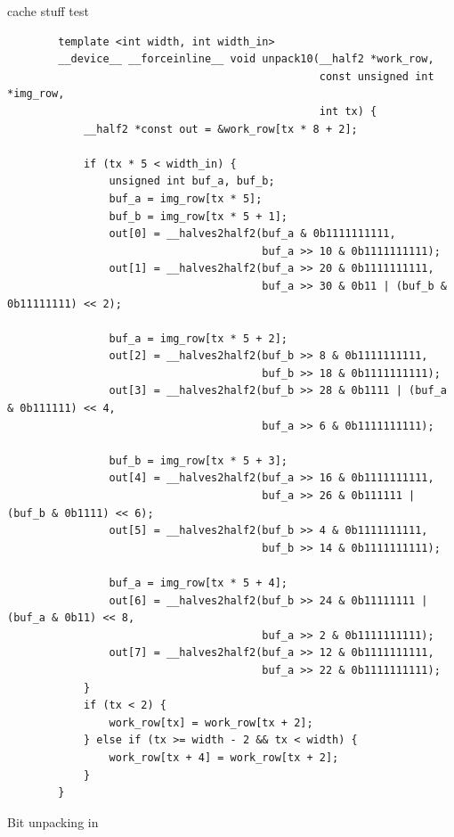 \todo cache stuff test


\begin{listing}[H]
    \begin{verbatim}
        template <int width, int width_in>
        __device__ __forceinline__ void unpack10(__half2 *work_row, 
                                                 const unsigned int *img_row,
                                                 int tx) {
            __half2 *const out = &work_row[tx * 8 + 2];
        
            if (tx * 5 < width_in) {
                unsigned int buf_a, buf_b;
                buf_a = img_row[tx * 5];
                buf_b = img_row[tx * 5 + 1];
                out[0] = __halves2half2(buf_a & 0b1111111111, 
                                        buf_a >> 10 & 0b1111111111);
                out[1] = __halves2half2(buf_a >> 20 & 0b1111111111,
                                        buf_a >> 30 & 0b11 | (buf_b & 0b11111111) << 2);
        
                buf_a = img_row[tx * 5 + 2];
                out[2] = __halves2half2(buf_b >> 8 & 0b1111111111, 
                                        buf_b >> 18 & 0b1111111111);
                out[3] = __halves2half2(buf_b >> 28 & 0b1111 | (buf_a & 0b111111) << 4,
                                        buf_a >> 6 & 0b1111111111);

                buf_b = img_row[tx * 5 + 3];
                out[4] = __halves2half2(buf_a >> 16 & 0b1111111111,
                                        buf_a >> 26 & 0b111111 | (buf_b & 0b1111) << 6);
                out[5] = __halves2half2(buf_b >> 4 & 0b1111111111, 
                                        buf_b >> 14 & 0b1111111111);
        
                buf_a = img_row[tx * 5 + 4];
                out[6] = __halves2half2(buf_b >> 24 & 0b11111111 | (buf_a & 0b11) << 8,
                                        buf_a >> 2 & 0b1111111111);
                out[7] = __halves2half2(buf_a >> 12 & 0b1111111111, 
                                        buf_a >> 22 & 0b1111111111);
            }
            if (tx < 2) {
                work_row[tx] = work_row[tx + 2];
            } else if (tx >= width - 2 && tx < width) {
                work_row[tx + 4] = work_row[tx + 2];
            }
        }
    \end{verbatim}
    \caption{Bit unpacking in \cuda}
\end{listing}